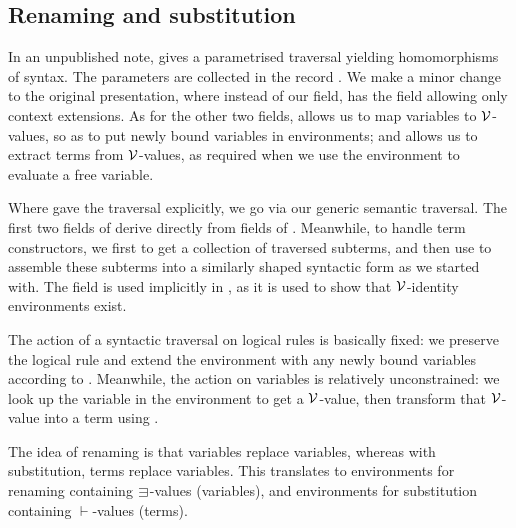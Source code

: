 \subsection{Renaming and substitution}

In an unpublished note, \citet{McBride05} gives a parametrised traversal
yielding homomorphisms of syntax.
The parameters are collected in the record .
We make a minor change to the original presentation, where instead of our
 field, \citeauthor{McBride05} has the
field  allowing only context extensions.
As for the other two fields,  allows us to map variables to
$\mathcal V$-values, so as to put newly bound variables in environments; and
 allows us to extract terms from $\mathcal V$-values, as required when
we use the environment to evaluate a free variable.


Where \citeauthor{McBride05} gave the traversal explicitly, we go via our
generic semantic traversal.
The first two fields of  derive directly from fields of
.
Meanwhile, to handle term constructors, we first  to get a
collection of traversed subterms, and then use 
to assemble these subterms into a similarly shaped syntactic form as we started
with.
The  field is used implicitly in , as it is
used to show that $\mathcal V$-identity environments exist.


The action of a syntactic traversal on logical rules is basically fixed: we
preserve the logical rule and extend the environment with any newly bound
variables according to .
Meanwhile, the action on variables is relatively unconstrained: we look up the
variable in the environment to get a $\mathcal V$-value, then transform that $\mathcal V$-value
into a term using .

The idea of renaming is that variables replace variables, whereas with
substitution, terms replace variables.
This translates to environments for renaming containing $\sqni$-values
(variables), and environments for substitution containing $\vdash$-values
(terms).



